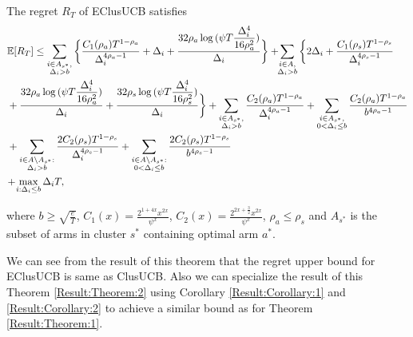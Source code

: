 \begin{theorem}
\label{Result:Theorem:2}
The regret $R_T$ of EClusUCB satisfies
\begin{align*}
&\mathbb{E} [R_{T}]\leq 
\sum\limits_{\substack{i\in A_{s^{*}},\\\Delta_{i} > b}}\bigg\lbrace \dfrac{C_1(\rho_{a})T^{1-\rho_{a}}}{\Delta_{i}^{4\rho_{a}-1}} + \Delta_{i}
 + \frac{32\rho_{a}\log{(\psi T\dfrac{\Delta_{i}^{4}}{16\rho_{a}^{2}})}}{\Delta_{i}} \bigg\rbrace
 + \! \! \sum\limits_{\substack{i\in A,\\\Delta_{i} > b}} \bigg\lbrace 2\Delta_{i}+
\dfrac{C_1(\rho_{s})T^{1-\rho_{s}}}{\Delta_{i}^{4\rho_{s}-1}} \\
&+ \frac{32\rho_{a}\log{(\psi T\dfrac{\Delta_{i}^{4}}{16\rho_{a}^{2}})}}{\Delta_{i}} 
+ \dfrac{32\rho_{s}\log{(\psi T\dfrac{\Delta_{i}^{4}}{16\rho_{s}^{2}})}}{\Delta_{i}}\bigg\rbrace
+ \sum\limits_{\substack{i\in A_{s^{*}},\\ \Delta_{i} > b}} 
\frac{C_2(\rho_{a})T^{1-\rho_{a}}}{\Delta_{i}^{4\rho_{a}-1}}
+\sum\limits_{\substack{i\in A_{s^{*}},\\0 < \Delta_{i}\leq b}}\frac{C_2(\rho_a)T^{1-\rho_{a}}}{b^{4\rho_{a} -1}}\\ 
&+ \sum_{\substack{i\in A\setminus A_{s^*}:\\\Delta_{i}> b}}\dfrac{2C_{2}(\rho_{s})T^{1-\rho_{s}}}{\Delta_{i}^{4\rho_{s}-1}} +\sum_{\substack{i\in A \setminus A_{s^*}:\\ 0 < \Delta_{i} \leq b}}\dfrac{2C_{2}(\rho_{s})T^{1-\rho_{s}}}{b^{4\rho_{s}-1}}\\
& \!+\! \max\limits_{i:\Delta_{i}\leq b}\Delta_{i}T, 
\end{align*}

where $b\geq \sqrt{\frac{e}{T}}$, $C_1(x) = \frac{2^{1+4x}x^{2x}}{\psi^{x}}$, $C_2(x) = \frac{2^{2x+\frac{3}{2}}x^{2x}}{\psi^{x}}$, $\rho_{a}\leq \rho_{s}$ and $A_{s^{*}}$ is the subset of arms in cluster $s^{*}$ containing optimal arm $a^{*}$.
\end{theorem}

We can see from the result of this theorem that the regret upper bound for EClusUCB is same as ClusUCB. Also we can specialize the result of this Theorem \ref{Result:Theorem:2} using Corollary \ref{Result:Corollary:1} and \ref{Result:Corollary:2} to achieve a similar bound as for Theorem \ref{Result:Theorem:1}.

